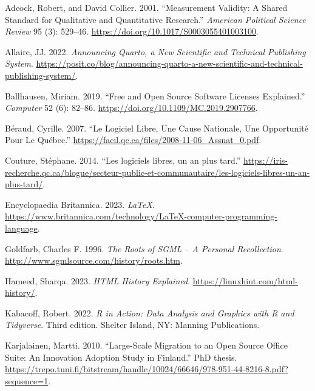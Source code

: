 \documentclass[
  letterpaper,
]{scrbook}
\newlength{\cslhangindent}
\newlength{\cslentryspacingunit} %
\newenvironment{CSLReferences}[2] %
 {%
  \setlength{\parindent}{0pt}
  \ifodd #1
  \let\oldpar\par
  \def\par{\hangindent=\cslhangindent\oldpar}
  \fi
  \setlength{\parskip}{#2\cslentryspacingunit}
 }%
 {}
\begin{document}
\hypertarget{refs}{}
\begin{CSLReferences}{1}{0}
\leavevmode{}%
Adcock, Robert, and David Collier. 2001. {``Measurement {Validity}: {A
Shared Standard} for {Qualitative} and {Quantitative Research}.''}
\emph{American Political Science Review} 95 (3): 529--46.
\url{https://doi.org/10.1017/S0003055401003100}.

\leavevmode{}%
Allaire, JJ. 2022. \emph{Announcing {Quarto}, a New Scientific and
Technical Publishing System}.
\url{https://posit.co/blog/announcing-quarto-a-new-scientific-and-technical-publishing-system/}.

\leavevmode{}%
Ballhausen, Miriam. 2019. {``Free and Open Source Software Licenses
Explained.''} \emph{Computer} 52 (6): 82--86.
\url{https://doi.org/10.1109/MC.2019.2907766}.

\leavevmode{}%
Béraud, Cyrille. 2007. {``Le Logiciel Libre, Une Cause Nationale, Une
Opportunité Pour Le Québec.''}
\url{https://facil.qc.ca/files/2008-11-06_Assnat_0.pdf}.

\leavevmode{}%
Couture, Stéphane. 2014. {``Les logiciels libres, un an plus tard.''}
\url{https://iris-recherche.qc.ca/blogue/secteur-public-et-communautaire/les-logiciels-libres-un-an-plus-tard/}.

\leavevmode{}%
Encyclopaedia Britannica. 2023. \emph{{LaTeX}}.
\url{https://www.britannica.com/technology/LaTeX-computer-programming-language}.

\leavevmode{}%
Goldfarb, Charles F. 1996. \emph{The {Roots} of {SGML} -- {A Personal
Recollection}}. \url{http://www.sgmlsource.com/history/roots.htm}.

\leavevmode{}%
Hameed, Sharqa. 2023. \emph{{HTML History} \textbar{} {Explained}}.
\url{https://linuxhint.com/html-history/}.

\leavevmode{}%
Kabacoff, Robert. 2022. \emph{R in Action: Data Analysis and Graphics
with {R} and {Tidyverse}}. Third edition. {Shelter Island, NY}: {Manning
Publications}.

\leavevmode{}%
Karjalainen, Martti. 2010. {``Large-Scale Migration to an Open Source
Office Suite: An Innovation Adoption Study in Finland.''} PhD thesis.
\url{https://trepo.tuni.fi/bitstream/handle/10024/66646/978-951-44-8216-8.pdf?sequence=1}.


\end{CSLReferences}
\end{document}
